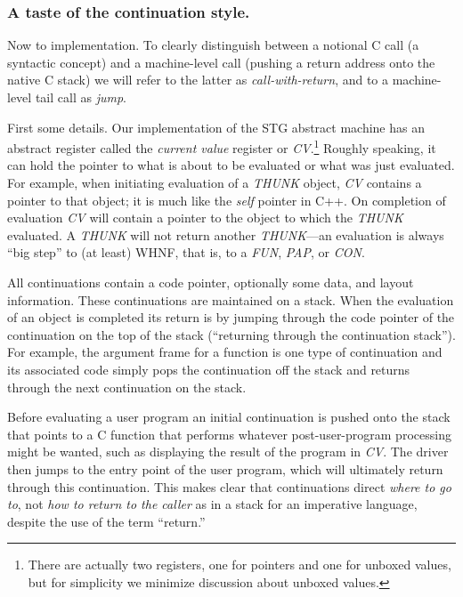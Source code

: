 \documentclass{llncs}
\begin{document}
\subsubsection{A taste of the continuation style.}
Now to implementation.  To clearly distinguish between a notional C call (a
syntactic concept) and a machine-level call (pushing a return address onto the
native C stack) we will refer to the latter as \emph{call-with-return}, and to
a machine-level tail call as \emph{jump}.

First some details.  Our implementation of the STG abstract machine has an
abstract register called the \emph{current value} register or
\emph{CV}.\footnote{There are actually two registers, one for pointers and
  one for unboxed values, but for simplicity we minimize discussion about
  unboxed values.}  Roughly speaking, it can hold the pointer to what is about
to be evaluated or what was just evaluated.  For example, when initiating
evaluation of a \emph{THUNK} object, \emph{CV} contains a pointer to that
object; it is much like the \emph{self} pointer in C++.  On completion of
evaluation \emph{CV} will contain a pointer to the object to which the
\emph{THUNK} evaluated.  A \emph{THUNK} will not return another
\emph{THUNK}---an evaluation is always ``big step'' to (at least) WHNF, that
is, to a \emph{FUN}, \emph{PAP}, or \emph{CON}.

All continuations contain a code pointer, optionally some data, and layout
information.  These continuations are maintained on a stack.  When the
evaluation of an object is completed its return is by jumping through the code
pointer of the continuation on the top of the stack (``returning through the
continuation stack'').  For example, the argument frame for a function is one
type of continuation and its associated code simply pops the continuation off
the stack and returns through the next continuation on the stack.

Before evaluating a user program an initial continuation is pushed onto
the stack that points to a C function that performs whatever post-user-program
processing might be wanted, such as displaying the result of the program in
\emph{CV}\@.  The driver then jumps to the entry point of the user program,
which will ultimately return through this continuation.  This makes clear
that continuations direct \emph{where to go to}, not \emph{how to return
to the caller} as in a stack for an imperative language, despite the use of
the term ``return.''
\end{document}
